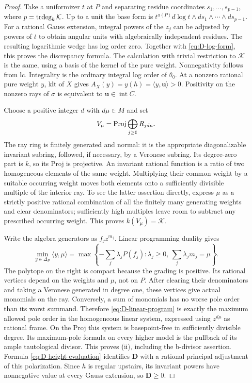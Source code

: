 \begin{proof}
Take a uniformizer $t$ at $P$ and separating residue coordinates
$s_1,\ldots,s_{p-1}$, where $p=\operatorname{trdeg}_k\mathcal K$.  Up to a unit the base
form is
$t^{a(P)}d\log t\wedge ds_1\wedge\cdots\wedge ds_{p-1}$.
For a rational Gauss extension, integral powers of the $z_j$ can be
adjusted by powers of $t$ to obtain angular units with algebraically
independent residues.  The resulting logarithmic wedge has log order zero.
Together with \eqref{eq:D-log-form}, this proves the discrepancy formula.
The calculation with trivial restriction to $\mathcal K$ is the same,
using a basis of the kernel of the pure weight.  Nonnegativity follows
from lc.  Integrality is the ordinary integral log order of $\theta_0$.
At a nonzero rational pure weight $y$, klt of $X$ gives
$A_X(y)=y(h)=\langle y,\mathbf u\rangle>0$.  Positivity on the nonzero
rays of $\sigma$ is equivalent to $\mathbf u\in\operatorname{int}C$.

Choose a positive integer $d$ with $d\mu\in M$ and set
\[
 V_\mu=\operatorname{Proj}\bigoplus_{j\ge0}R_{jd\mu}.
\]
The ray ring is finitely generated and normal: it is the appropriate
diagonalizable invariant subring, followed, if necessary, by a Veronese
subring.  Its degree-zero part is $k$, so its Proj is projective.  An
invariant rational function is a ratio of two homogeneous elements of the
same weight.  Multiplying their common weight by a suitable occurring
weight moves both elements onto a sufficiently divisible multiple of the
interior ray.  To see the latter assertion directly, express $\mu$ as a
strictly positive rational combination of all the finitely many generating
weights and clear denominators; sufficiently high multiples leave room to
subtract any prescribed occurring weight.  This proves
$k(V_\mu)=\mathcal K$.

Write the algebra generators as $f_jz^{m_j}$.  Linear programming duality
gives
\begin{equation}\label{eq:D-linear-program}
 \min_{y\in\Delta_P}\langle y,\mu\rangle
 =\max\left\{-\sum_j\lambda_jP(f_j):
       \lambda_j\ge0,\ \sum_j\lambda_jm_j=\mu\right\}.
\end{equation}
The polytope on the right is compact because the grading is positive.
Its rational vertices depend on the weights and $\mu$, not on $P$.
After clearing their denominators and taking a Veronese generated in
degree one, these vertices give actual monomials on the ray.  Conversely,
a sum of monomials has no worse pole order than its worst summand.
Therefore \eqref{eq:D-linear-program} is exactly the maximum allowed pole
order in the homogeneous linear system, expressed using $z^{d\mu}$ as
rational frame.  On the Proj this system is basepoint-free in sufficiently
divisible degree.  Its maximum-pole formula on every higher model is the
pullback of its ample tautological divisor.  This proves (ii), including
the b-divisor assertion.  Formula \eqref{eq:D-height-evaluation} identifies
$\mathbf D$ with a rational principal adjustment of this polarization.
Since $h$ is regular upstairs, its invariant powers have nonnegative
value at every Gauss extension, so $\mathbf D\ge0$.


\end{proof}
